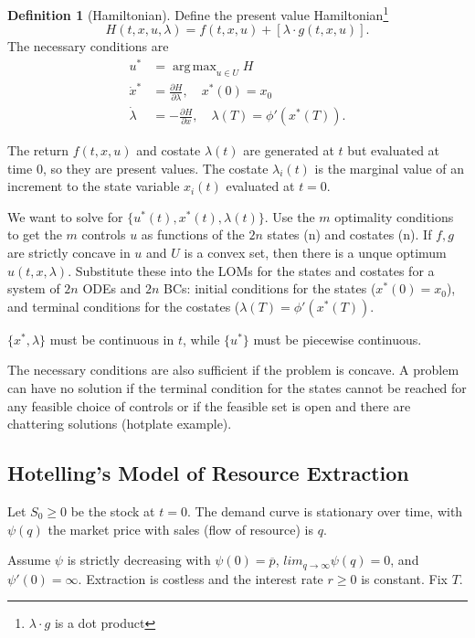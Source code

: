 \documentclass{tufte-handout}
\DeclareMathOperator*{\argmax}{arg\,max} %
\theoremstyle{definition}
\newtheorem{defn}[thm]{Definition}
\begin{document}
\begin{defn}[Hamiltonian]
	Define the present value Hamiltonian\footnote{$\lambda\cdot g$ is a dot product} 
	\begin{equation}
		H(t,x,u,\lambda) = f(t,x,u) + \left[ \lambda \cdot g(t,x,u) \right].
	\end{equation}
	The necessary conditions are
	\begin{align*}
		u^* &= \argmax_{u \in U} H \\
		\dot{x}^* &= \frac{\partial H}{\partial \lambda} , \quad x^*(0) = x_0 \quad \\
		\dot{\lambda} &= -\frac{\partial H}{\partial x} , \quad \lambda(T) = \phi'(x^*(T)).
	\end{align*}
\end{defn}

The return $f(t,x,u)$ and costate $\lambda(t)$ are generated at $t$ but evaluated at time $0$, so they are present values. The costate $\lambda_i(t)$ is the marginal value of an increment to the state variable $x_i(t)$ evaluated at $t=0$.

We want to solve for $\{u^*(t), x^*(t), \lambda(t)\}$. Use the $m$ optimality conditions to get the $m$ controls $u$ as functions of the $2n$ states (n) and costates (n). If $f,g$ are strictly concave in $u$ and $U$ is a convex set, then there is a unque optimum $\hat{u}(t,x,\lambda)$. Substitute these into the LOMs for the states and costates for a system of $2n$ ODEs and $2n$ BCs: initial conditions for the states ($x^*(0) = x_0$), and terminal conditions for the costates ($\lambda(T) = \phi'(x^*(T))$.

$\{x^*,\lambda\}$ must be continuous in $t$, while $\{u^*\}$ must be piecewise continuous.

The necessary conditions are also sufficient if the problem is concave. A problem can have no solution if the terminal condition for the states cannot be reached for any feasible choice of controls or if the feasible set is open and there are chattering solutions (hotplate example).

\subsection{Hotelling's Model of Resource Extraction}

Let $S_0 \ge 0$ be the stock at $t=0$. The demand curve is stationary over time, with $\psi(q)$ the market price with sales (flow of resource) is $q$.

Assume $\psi$ is strictly decreasing with $\psi\left( 0 \right) = \overline{p}$, $lim_{q \to \infty} \psi(q) = 0$, and $\psi'(0) = \infty$. Extraction is costless and the interest rate $r \ge 0$ is constant. Fix $T$.
\end{document}
